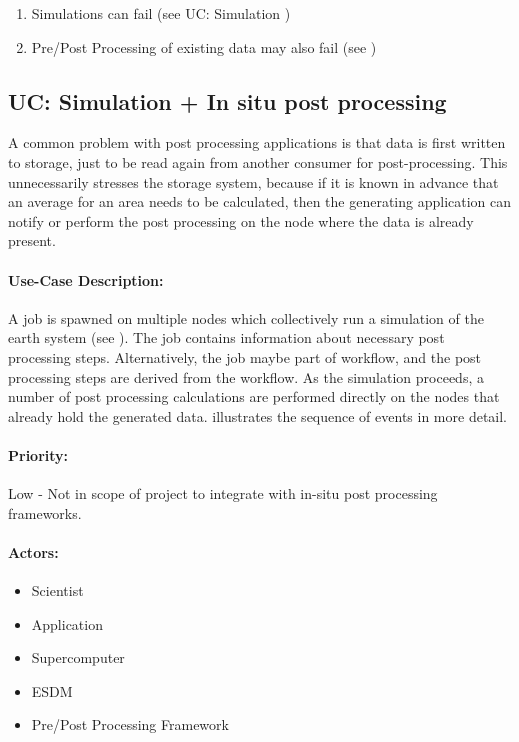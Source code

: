 \begin{enumerate}
	\item Simulations can fail (see UC: Simulation )
	\item Pre/Post Processing of existing data may also fail (see )
\end{enumerate}


\subsection{UC: Simulation + In situ post processing}
\label{uc: simulation + in-situ + post processing}

A common problem with post processing applications is that data is first written to storage, just to be read again from another consumer for post-processing.
This unnecessarily stresses the storage system, because if it is known in advance that an average for an area needs to be calculated, then the generating application can notify or perform the post processing on the node where the data is already present.


\paragraph{Use-Case Description:}
A job is spawned on multiple nodes which collectively run a simulation of the earth system (see ).
The job contains information about necessary post processing steps.
Alternatively, the job maybe part of workflow, and the post processing steps are derived from the workflow.
As the simulation proceeds, a number of post processing calculations are performed directly on the nodes that already hold the generated data.
 illustrates the sequence of events in more detail.

\paragraph{Priority:} Low - Not in scope of project to integrate with in-situ post processing frameworks.


\paragraph{Actors:}
\begin{itemize}
	\item Scientist
	\item Application
	\item Supercomputer
	\item ESDM
	\item Pre/Post Processing Framework
\end{itemize}



